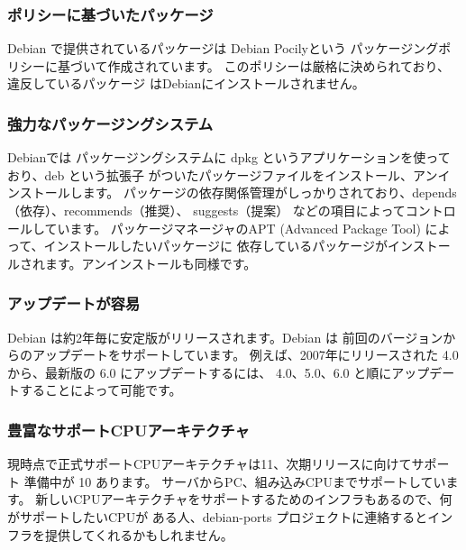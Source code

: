 \documentclass[mingoth,a4paper]{jsarticle}
\begin{document}

\subsubsection{ポリシーに基づいたパッケージ}
Debian で提供されているパッケージは Debian Pocilyという
パッケージングポリシーに基づいて作成されています。
このポリシーは厳格に決められており、違反しているパッケージ
はDebianにインストールされません。

\subsubsection{強力なパッケージングシステム}
Debianでは パッケージングシステムに dpkg というアプリケーションを使っており、deb という拡張子
がついたパッケージファイルをインストール、アンインストールします。
パッケージの依存関係管理がしっかりされており、depends（依存）、recommends（推奨）、
suggests（提案） などの項目によってコントロールしています。
パッケージマネージャのAPT (Advanced Package Tool) によって、インストールしたいパッケージに
依存しているパッケージがインストールされます。アンインストールも同様です。

\subsubsection{アップデートが容易}
Debian は約2年毎に安定版がリリースされます。Debian は 
前回のバージョンからのアップデートをサポートしています。
例えば、2007年にリリースされた 4.0 から、最新版の 6.0 にアップデートするには、
4.0、5.0、6.0 と順にアップデートすることによって可能です。

\subsubsection{豊富なサポートCPUアーキテクチャ}
現時点で正式サポートCPUアーキテクチャは11、次期リリースに向けてサポート
準備中が 10 あります。
サーバからPC、組み込みCPUまでサポートしています。
新しいCPUアーキテクチャをサポートするためのインフラもあるので、何がサポートしたいCPUが
ある人、debian-ports プロジェクトに連絡するとインフラを提供してくれるかもしれません。
\end{document}
